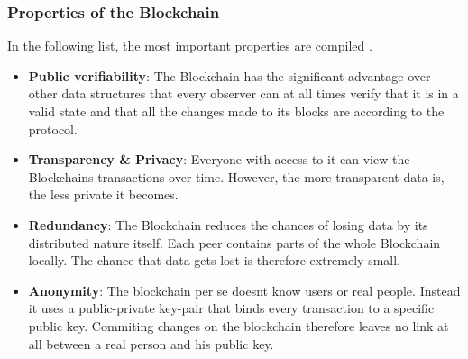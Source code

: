 \subsubsection{Properties of the Blockchain}
In the following list, the most important properties are compiled \cite{Wust2017}.\begin{itemize}
  \item \textbf{Public verifiability}: The Blockchain has the significant advantage over other data structures that every observer can at all times verify that it is in a valid state and that all the changes made to its blocks are according to the protocol.
  \item \textbf{Transparency \& Privacy}: Everyone with access to it can view the Blockchains transactions over time. However, the more transparent data is, the less private it becomes.
  \item \textbf{Redundancy}: The Blockchain reduces the chances of losing data by its distributed nature itself. Each peer contains parts of the whole Blockchain locally. The chance that data gets lost is therefore extremely small.
  \item \textbf{Anonymity}: The blockchain per se doesnt know users or real people. Instead it uses a public-private key-pair that binds every transaction to a specific public key. Commiting changes on the blockchain therefore leaves no link at all between a real person and his public key.
\end{itemize}

